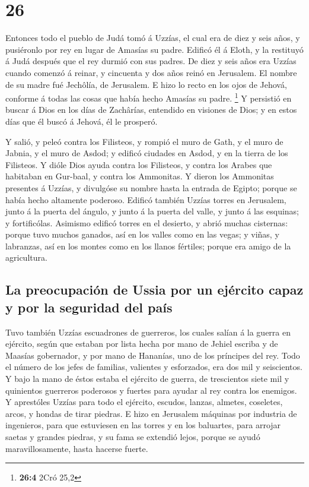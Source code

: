 \hypertarget{section-25}{%
\section{26}\label{section-25}}

 Entonces todo el pueblo de Judá tomó á Uzzías, el cual
era de diez y seis años, y pusiéronlo por rey en lugar de Amasías su
padre.  Edificó él á Eloth, y la restituyó á Judá después
que el rey durmió con sus padres.  De diez y seis años era
Uzzías cuando comenzó á reinar, y cincuenta y dos años reinó en
Jerusalem. El nombre de su madre fué Jechôlía, de Jerusalem.
 E hizo lo recto en los ojos de Jehová, conforme á todas
las cosas que había hecho Amasías su padre. \footnote{\textbf{26:4} 2Cró
  25,2}  Y persistió en buscar á Dios en los días de
Zachârías, entendido en visiones de Dios; y en estos días que él buscó á
Jehová, él le prosperó.

 Y salió, y peleó contra los Filisteos, y rompió el muro
de Gath, y el muro de Jabnia, y el muro de Asdod; y edificó ciudades en
Asdod, y en la tierra de los Filisteos.  Y dióle Dios
ayuda contra los Filisteos, y contra los Arabes que habitaban en
Gur-baal, y contra los Ammonitas.  Y dieron los Ammonitas
presentes á Uzzías, y divulgóse su nombre hasta la entrada de Egipto;
porque se había hecho altamente poderoso.  Edificó también
Uzzías torres en Jerusalem, junto á la puerta del ángulo, y junto á la
puerta del valle, y junto á las esquinas; y fortificólas.
 Asimismo edificó torres en el desierto, y abrió muchas
cisternas: porque tuvo muchos ganados, así en los valles como en las
vegas; y viñas, y labranzas, así en los montes como en los llanos
fértiles; porque era amigo de la agricultura.

\hypertarget{la-preocupaciuxf3n-de-ussia-por-un-ejuxe9rcito-capaz-y-por-la-seguridad-del-pauxeds}{%
\subsection{La preocupación de Ussia por un ejército capaz y por la
seguridad del
país}\label{la-preocupaciuxf3n-de-ussia-por-un-ejuxe9rcito-capaz-y-por-la-seguridad-del-pauxeds}}

 Tuvo también Uzzías escuadrones de guerreros, los cuales
salían á la guerra en ejército, según que estaban por lista hecha por
mano de Jehiel escriba y de Maasías gobernador, y por mano de Hananías,
uno de los príncipes del rey.  Todo el número de los
jefes de familias, valientes y esforzados, era dos mil y seiscientos.
 Y bajo la mano de éstos estaba el ejército de guerra, de
trescientos siete mil y quinientos guerreros poderosos y fuertes para
ayudar al rey contra los enemigos.  Y aprestóles Uzzías
para todo el ejército, escudos, lanzas, almetes, coseletes, arcos, y
hondas de tirar piedras.  E hizo en Jerusalem máquinas
por industria de ingenieros, para que estuviesen en las torres y en los
baluartes, para arrojar saetas y grandes piedras, y su fama se extendió
lejos, porque se ayudó maravillosamente, hasta hacerse fuerte.

